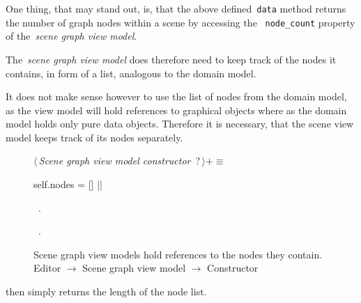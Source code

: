\documentclass[%
    a4paper,    %
    justified,  %
    nobib,      %
    openany     %
]{tufte-book}
\makeatletter
\renewcommand{\label}[1]{\@tufte@label{##1}}%
\makeatother
\begin{document}
One thing, that may stand out, is, that the above defined~\verb=data= method
returns the number of graph nodes within a scene by accessing the
~\verb=node_count= property of the~\emph{scene graph view model}.

The~\emph{scene graph view model} does therefore need to keep track of the nodes it
contains, in form of a list, analogous to the domain model.

It does not make sense however to use the list of nodes from the domain model,
as the view model will hold references to graphical objects where as the domain
model holds only pure data objects. Therefore it is necessary, that the scene
view model keeps track of its nodes separately.

\begin{figure}
\begin{flushleft} \small
\begin{minipage}{\linewidth}\label{scrap37}\raggedright\small
{} $\langle\,${\itshape Scene graph view model constructor}\nobreak\ {\footnotesize {?}}$\,\rangle+\equiv$
\vspace{-1ex}
\begin{pythoncode}
    self.nodes = []
|\NWsep|
\end{pythoncode}
\vspace{1.5ex}
\footnotesize
\begin{list}{}{\setlength{\itemsep}{-\parsep}\setlength{\itemindent}{-\leftmargin}}
\item \NWtxtMacroDefBy\ .
\item \NWtxtMacroRefIn\ .

\item{}
\end{list}
\end{minipage}\vspace{4ex}
\end{flushleft}
\caption{Scene graph view models hold references to the nodes they contain.
  \newline{}\newline{}Editor $\rightarrow$ Scene graph view model $\rightarrow$
  Constructor}
\label{editor:lst:scene-graph-view-model:constructor:nodes}
\end{figure}

 then simply returns the length of the node
list.
\end{document}
